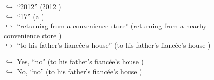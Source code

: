 \documentclass[11pt,a4paper, onecolumn]{article}
\begin{document}
\begin{figure}[t]
\begin{tcolorbox}[boxsep=0pt,left=5pt,right=0pt,top=2pt,colback = yellow!5]
\begin{dialogue}
\colorbox{pink!25}{$\hookrightarrow$}
{ ``2012'' (2012 ) }
\\
\colorbox{pink!25}{$\hookrightarrow$}
{ ``17'' (a ) }
\\
\colorbox{pink!25}{$\hookrightarrow$}
{ ``returning from a convenience store'' (returning from a nearby convenience store ) }
\\
\colorbox{pink!25}{$\hookrightarrow$}
{ ``to his father's fiancée's house'' (to his father's fiancée's house ) }
\\
 \end{dialogue}\end{tcolorbox}\end{figure}\begin{figure}[t] \small \begin{tcolorbox}[boxsep=0pt,left=5pt,right=0pt,top=2pt,colback = yellow!5] \begin{dialogue}
 \small 
\colorbox{pink!25}{$\hookrightarrow$}
\colorbox{red!25}{Yes,}
{ ``no'' (to his father's fiancée's house ) }
\\
\colorbox{pink!25}{$\hookrightarrow$}
\colorbox{red!25}{No,}
{ ``no'' (to his father's fiancée's house ) }
\\
 \end{dialogue}\end{tcolorbox}\end{figure}
\end{document}
